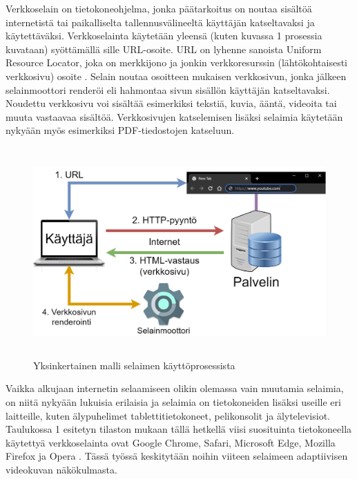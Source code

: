 \documentclass[finnish, 12pt, a4paper, elec, utf8, a-1b, online]{aaltothesis}
\begin{document}
Verkkoselain on tietokoneohjelma, jonka päätarkoitus on noutaa sisältöä internetistä tai paikalliselta tallennusvälineeltä käyttäjän katseltavaksi ja käytettäväksi. Verkkoselainta käytetään yleensä (kuten kuvassa 1 prosessia kuvataan) syöttämällä sille URL-osoite. URL on lyhenne sanoista Uniform Resource Locator, joka on merkkijono ja jonkin verkkoresurssin (lähtökohtaisesti verkkosivu) osoite \cite{URL}. Selain noutaa osoitteen mukaisen verkkosivun, jonka jälkeen selainmoottori renderöi eli hahmontaa sivun sisällön käyttäjän katseltavaksi. Noudettu verkkosivu voi sisältää esimerkiksi tekstiä, kuvia, ääntä, videoita tai muuta vastaavaa sisältöä. Verkkosivujen katselemisen lisäksi selaimia käytetään nykyään myös esimerkiksi PDF-tiedostojen katseluun. \\

\begin{figure}[htb]
  \centering
  \includegraphics[height=8cm]{./img/browser.png}
  \caption{Yksinkertainen malli selaimen käyttöprosessista \label{kuva1}}
\end{figure}

\noindent Vaikka alkujaan internetin selaamiseen olikin olemassa vain muutamia selaimia, on niitä nykyään lukuisia erilaisia ja selaimia on tietokoneiden lisäksi useille eri laitteille, kuten älypuhelimet tablettitietokoneet, pelikonsolit ja älytelevisiot. Taulukossa 1 esitetyn tilaston mukaan tällä hetkellä viisi suosituinta tietokoneella käytettyä verkkoselainta ovat Google Chrome, Safari, Microsoft Edge, Mozilla Firefox ja Opera \cite{StatCounter}\cite{Similiarweb}. Tässä työssä keskitytään noihin viiteen selaimeen adaptiivisen videokuvan näkökulmasta. \\
\end{document}
